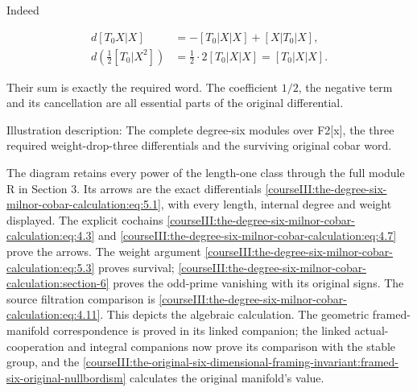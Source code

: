 Indeed

\begin{equation}
\begin{aligned}
 d[T_0X|X]&=-[T_0|X|X]+[X|T_0|X],\\
 d\!\left(\frac12[T_0|X^2]\right)
   &=\frac12\cdot2[T_0|X|X]=[T_0|X|X].
\end{aligned}
\label{courseIII:the-degree-six-milnor-cobar-calculation:eq:7.5}
\end{equation}

Their sum is exactly the required word. The coefficient \(1/2\), the negative term and its cancellation are all essential parts of the original differential.

Illustration description: The complete degree-six modules over F2{[}x{]}, the three required weight-drop-three differentials and the surviving original cobar word.

The diagram retains every power of the length-one class through the full module R in Section 3. Its arrows are the exact differentials \eqref{courseIII:the-degree-six-milnor-cobar-calculation:eq:5.1}, with every length, internal degree and weight displayed. The explicit cochains \eqref{courseIII:the-degree-six-milnor-cobar-calculation:eq:4.3} and \eqref{courseIII:the-degree-six-milnor-cobar-calculation:eq:4.7} prove the arrows. The weight argument \eqref{courseIII:the-degree-six-milnor-cobar-calculation:eq:5.3} proves survival; \cref{courseIII:the-degree-six-milnor-cobar-calculation:section-6} proves the odd-prime vanishing with its original signs. The source filtration comparison is \eqref{courseIII:the-degree-six-milnor-cobar-calculation:eq:4.11}. This depicts the algebraic calculation. The geometric framed-manifold correspondence is proved in its linked companion; the linked actual-cooperation and integral companions now prove its comparison with the stable group, and the \cref{courseIII:the-original-six-dimensional-framing-invariant:framed-six-original-nullbordism} calculates the original manifold's value.

\label{courseIII:the-degree-six-milnor-cobar-calculation:six-cobar-source-use}
